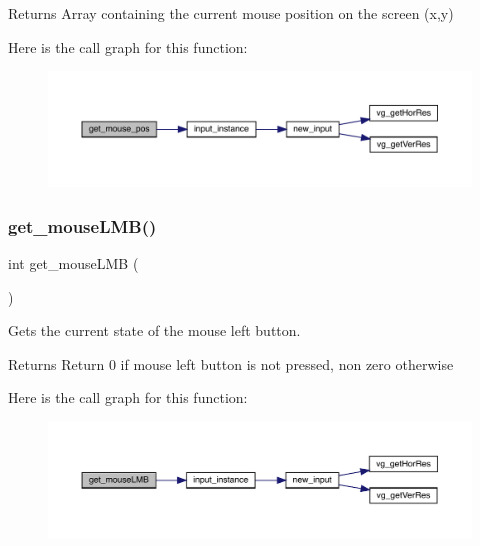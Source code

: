 \begin{DoxyReturn}{Returns}
Array containing the current mouse position on the screen (x,y) 
\end{DoxyReturn}
Here is the call graph for this function\+:\nopagebreak
\begin{figure}[H]
\begin{center}
\leavevmode
\includegraphics[width=350pt]{group___input_ga6ee316c978397c6807556fb9298ce902_cgraph}
\end{center}
\end{figure}
\hypertarget{group___input_gafff0cd01210126d49120f40045cafccc}{}\label{group___input_gafff0cd01210126d49120f40045cafccc} 
\subsubsection{\texorpdfstring{get\+\_\+mouse\+L\+M\+B()}{get\_mouseLMB()}}
{\footnotesize\ttfamily int get\+\_\+mouse\+L\+MB (\begin{DoxyParamCaption}{ }\end{DoxyParamCaption})}



Gets the current state of the mouse left button. 

\begin{DoxyReturn}{Returns}
Return 0 if mouse left button is not pressed, non zero otherwise 
\end{DoxyReturn}
Here is the call graph for this function\+:\nopagebreak
\begin{figure}[H]
\begin{center}
\leavevmode
\includegraphics[width=350pt]{group___input_gafff0cd01210126d49120f40045cafccc_cgraph}
\end{center}
\end{figure}
\hypertarget{group___input_ga38c8f84d3704d46011eee4fd423abaa2}{}\label{group___input_ga38c8f84d3704d46011eee4fd423abaa2} 
